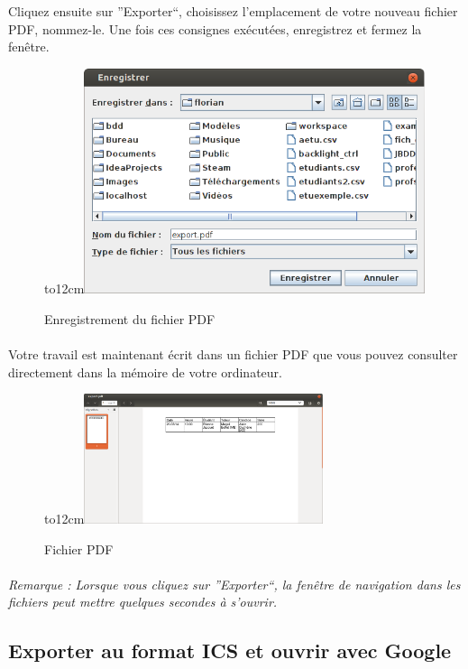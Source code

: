 \documentclass[a4paper,10pt]{report}
\begin{document}
	  Cliquez ensuite sur ''Exporter``, choisissez l'emplacement de votre nouveau fichier PDF, nommez-le.
	  Une fois ces consignes exécutées, enregistrez et fermez la fenêtre.
	  
	  \begin{figure}[H]
	    \hbox to12cm{\hss\includegraphics[width=10cm]{../general/nav.png}\hss}
	    \caption{Enregistrement du fichier PDF}
	  \end{figure}
	
	\paragraph{}
	  Votre travail est maintenant écrit dans un fichier PDF que vous pouvez consulter directement dans la mémoire de votre ordinateur.
	  
	  \begin{figure}[H]
	    \hbox to12cm{\hss\includegraphics[width=7cm]{../general/pdf.png}\hss}
	    \caption{Fichier PDF}
	  \end{figure}

	\paragraph{}
	  \textit{Remarque : Lorsque vous cliquez sur ''Exporter``, la fenêtre de navigation dans les fichiers peut mettre quelques secondes à s'ouvrir.}
	
      \subsection{Exporter au format ICS et ouvrir avec Google}
	  
\end{document}
